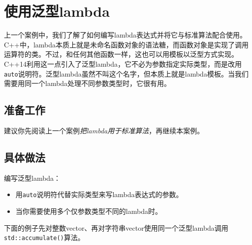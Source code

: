 
\section{使用泛型lambda}



上一个案例中，我们了解了如何编写lambda表达式并将它与标准算法配合使用。C++中，lambda本质上就是未命名函数对象的语法糖，而函数对象是实现了调用运算符的类。不过，和任何其他函数一样，这也可以用模板以泛型方式实现。C++14利用这一点引入了泛型lambda，它不必为参数指定实际类型，而是改用\texttt{auto}说明符。泛型lambda虽然不叫这个名字，但本质上就是lambda模板。当我们需要用同一个lambda处理不同参数类型时，它很有用。



\subsection{准备工作}



建议你先阅读上一个案例\textit{把lambda用于标准}\textit{算法}，再继续本案例。



\subsection{具体做法}



编写泛型lambda：



\begin{itemize}
\item 用\texttt{auto}说明符代替实际类型来写lambda表达式的参数。



\item 当你需要使用多个仅参数类型不同的lambda时。

\end{itemize}



下面的例子先对整数vector、再对字符串vector使用同一个泛型lambda调用\texttt{std::\allowbreak{}accumulate()}算法。



